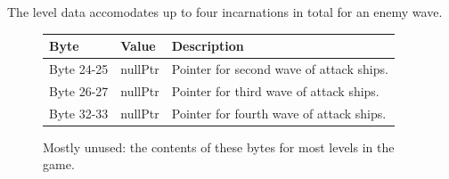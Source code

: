 The level data accomodates up to four incarnations in total for an enemy wave.

\begin{figure}[H]

  {
    \setlength{\tabcolsep}{3.0pt}
    \setlength\cmidrulewidth{\heavyrulewidth} %
    \begin{adjustbox}{center,width=12cm}

      \begin{tabular}{lll}
        \toprule
        Byte    & Value                     & Description                                                        \\
        \midrule
 Byte 24-25 & nullPtr\index{nullPtr}                   & Pointer for second wave of attack ships.                            \\
 Byte 26-27 & nullPtr\index{nullPtr}                   & Pointer for third wave of attack ships.                             \\
 Byte 32-33 & nullPtr                       & Pointer for fourth wave of attack ships.                            \\
        \bottomrule
      \end{tabular}
    \end{adjustbox}
  }\caption{Mostly unused: the contents of these bytes for most levels in the game.}
\end{figure}

